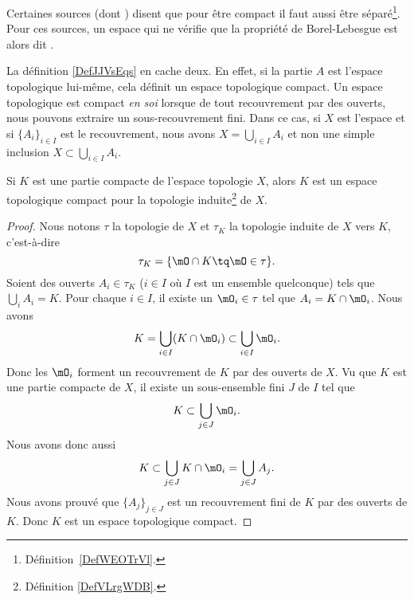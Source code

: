 \begin{remark}
    Certaines sources (dont ) disent que pour être compact il faut aussi être séparé\footnote{Définition~\ref{DefWEOTrVl}.}. Pour ces sources, un espace qui ne vérifie que la propriété de Borel-Lebesgue est alors dit .
\end{remark}

\begin{normaltext}
    La définition \ref{DefJJVsEqs} en cache deux. En effet, si la partie \( A\) est l'espace topologique lui-même, cela définit un espace topologique compact. Un espace topologique est compact \emph{en soi} lorsque de tout recouvrement par des ouverts, nous pouvons extraire un sous-recouvrement fini. Dans ce cas, si \( X\) est l'espace et si \( \{ A_i \}_{i\in I}\) est le recouvrement, nous avons \( X=\bigcup_{i\in I}A_i\) et non une simple inclusion \( X\subset \bigcup_{i\in I}A_i\).
\end{normaltext}

\begin{lemma}       \label{LEMooVYTRooKTIYdn}
    Si \( K\) est une partie compacte de l'espace topologie \( X\), alors \( K\) est un espace topologique compact pour la topologie induite\footnote{Définition \ref{DefVLrgWDB}.} de \( X\).
\end{lemma}

\begin{proof}
    Nous notons \( \tau\) la topologie de \( X\) et \( \tau_K\) la topologie induite de \( X\) vers \( K\), c'est-à-dire
    \begin{equation}
        \tau_K=\{ \mO\cap K\tq \mO\in\tau \}.
    \end{equation}
    Soient des ouverts \( A_i\in \tau_K\) (\( i\in I\) où \( I\) est un ensemble quelconque) tels que \( \bigcup_iA_i=K\). Pour chaque \( i\in I\), il existe un \( \mO_i\in \tau\) tel que \( A_i=K\cap\mO_i\). Nous avons
    \begin{equation}
        K=\bigcup_{i\in I}(K\cap\mO_i)\subset\bigcup_{i\in I}\mO_i.
    \end{equation}
    Donc les \( \mO_i\) forment un recouvrement de \( K\) par des ouverts de \( X\). Vu que \( K\) est une partie compacte de \( X\), il existe un sous-ensemble fini \( J\) de \( I\) tel que
    \begin{equation}
        K\subset\bigcup_{j\in J}\mO_i.
    \end{equation}
    Nous avons donc aussi
    \begin{equation}
        K\subset\bigcup_{j\in J}K\cap\mO_i=\bigcup_{j\in J}A_j.
    \end{equation}
    Nous avons prouvé que \( \{ A_j \}_{j\in J}\) est un recouvrement fini de \( K\) par des ouverts de \( K\). Donc \( K\) est un espace topologique compact.
\end{proof}

